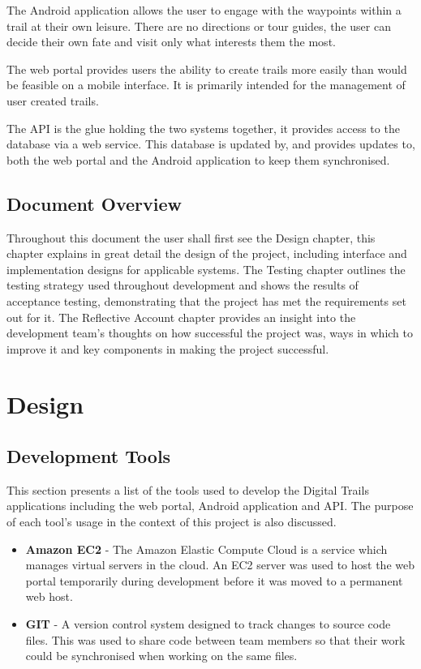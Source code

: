\documentclass[11pt,a4paper]{report}
\begin{document}
The Android application allows the user to engage with the waypoints within a trail at their own leisure. There are no directions or tour guides, the user can decide their own fate and visit only what interests them the most.

The web portal provides users the ability to create trails more easily than would be feasible on a mobile interface. It is primarily intended for the management of user created trails.

The API is the glue holding the two systems together, it provides access to the database via a web service. This database is updated by, and provides updates to, both the web portal and the Android application to keep them synchronised.

\section{Document Overview}
Throughout this document the user shall first see the Design chapter, this chapter explains in great detail the design of the project, including interface and implementation designs for applicable systems. The Testing chapter outlines the testing strategy used throughout development and shows the results of acceptance testing, demonstrating that the project has met the requirements set out for it. The Reflective Account chapter provides an insight into the development team's thoughts on how successful the project was, ways in which to improve it and key components in making the project successful. 

\setcounter{secnumdepth}{4}


\chapter{Design}
\newpage
\label{sec:design}

\section{Development Tools}

This section presents a list of the tools used to develop the Digital Trails applications including the web portal, Android application and API. The purpose of each tool's usage in the context of this project is also discussed.

\begin{itemize}

\item \textbf{Amazon EC2} - The Amazon Elastic Compute Cloud is a service which manages virtual servers in the cloud. An EC2 server was used to host the web portal temporarily during development before it was moved to a permanent web host.
   
\item \textbf{GIT} - A version control system designed to track changes to source code files. This was used to share code between team members so that their work could be synchronised when working on the same files.

\end{itemize}
\end{document}
